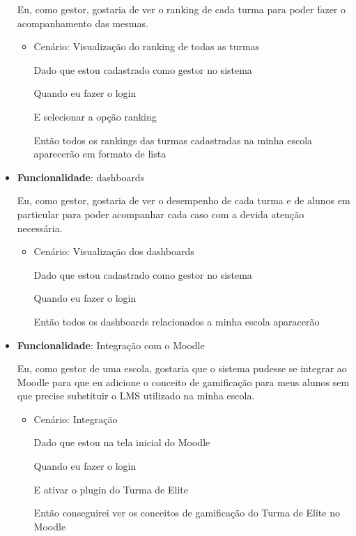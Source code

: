 \begin{itemize}
    Eu, como gestor, gostaria de ver o ranking de cada turma para poder fazer o acompanhamento das mesmas.
    \begin{itemize}
        \item Cenário: Visualização do ranking de todas as turmas
        \par Dado que estou cadastrado como gestor no sistema
        \par Quando eu fazer o login
        \par E selecionar a opção ranking
        \par Então todos os rankings das turmas cadastradas na minha escola aparecerão em formato de lista
    \end{itemize}

\item\textbf{Funcionalidade}: \glspl{dashboard}
    
    Eu, como gestor, gostaria de ver o desempenho de cada turma e de alunos em particular para poder acompanhar cada caso com a devida atenção necessária.
    \begin{itemize}
        \item Cenário: Visualização dos dashboards 
        \par Dado que estou cadastrado como gestor no sistema
        \par Quando eu fazer o login
        \par Então todos os dashboards relacionados a minha escola aparacerão
    \end{itemize}   

\item\textbf{Funcionalidade}: Integração com o Moodle
    
    Eu, como gestor de uma escola, gostaria que o sistema pudesse se integrar ao Moodle para que eu adicione o conceito de gamificação para meus alunos sem que precise substituir o LMS utilizado na minha escola.
    \begin{itemize}
        \item Cenário: Integração 
        \par Dado que estou na tela inicial do Moodle
        \par Quando eu fazer o login 
        \par E ativar o plugin do Turma de Elite
        \par Então conseguirei ver os conceitos de gamificação do Turma de Elite no Moodle
    \end{itemize}  
\end{itemize} 

